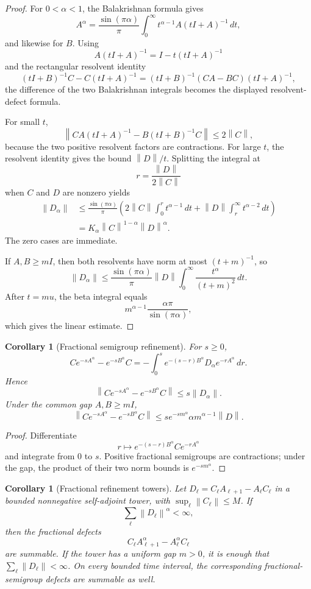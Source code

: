\documentclass[11pt]{article}
\newtheorem{corollary}[theorem]{Corollary}
\theoremstyle{definition}
\theoremstyle{remark}
\newcommand{\norm}[1]{\left\lVert#1\right\rVert}
\begin{document}
\begin{proof}
For $0<\alpha<1$, the Balakrishnan formula gives
\[
A^\alpha
=
\frac{\sin(\pi\alpha)}{\pi}
\int_0^\infty t^{\alpha-1}A(tI+A)^{-1}\,dt,
\]
and likewise for $B$.  Using
\[
A(tI+A)^{-1}=I-t(tI+A)^{-1}
\]
and the rectangular resolvent identity
\[
(tI+B)^{-1}C-C(tI+A)^{-1}
=
(tI+B)^{-1}(CA-BC)(tI+A)^{-1},
\]
the difference of the two Balakrishnan integrals becomes the displayed resolvent-defect formula.

For small $t$,
\[
\norm{CA(tI+A)^{-1}-B(tI+B)^{-1}C}
\le 2\norm C,
\]
because the two positive resolvent factors are contractions.  For large $t$, the resolvent identity gives the bound $\norm D/t$.  Splitting the integral at
\[
r=\frac{\norm D}{2\norm C}
\]
when $C$ and $D$ are nonzero yields
\[
\begin{aligned}
\norm{D_\alpha}
&\le
\frac{\sin(\pi\alpha)}{\pi}
\left(
2\norm C\int_0^r t^{\alpha-1}\,dt
+
\norm D\int_r^\infty t^{\alpha-2}\,dt
\right)\\
&=
K_\alpha\norm C^{1-\alpha}\norm D^\alpha.
\end{aligned}
\]
The zero cases are immediate.

If $A,B\ge mI$, then both resolvents have norm at most $(t+m)^{-1}$, so
\[
\norm{D_\alpha}
\le
\frac{\sin(\pi\alpha)}{\pi}\norm D
\int_0^\infty\frac{t^\alpha}{(t+m)^2}\,dt.
\]
After $t=mu$, the beta integral equals
\[
m^{\alpha-1}\frac{\alpha\pi}{\sin(\pi\alpha)},
\]
which gives the linear estimate.
\end{proof}

\begin{corollary}[Fractional semigroup refinement]\label{cor:fractional-semigroup-refinement}
For $s\ge0$,
\[
\boxed{
Ce^{-sA^\alpha}-e^{-sB^\alpha}C
=
-\int_0^s
 e^{-(s-r)B^\alpha}D_\alpha e^{-rA^\alpha}\,dr.
}
\]
Hence
\[
\norm{Ce^{-sA^\alpha}-e^{-sB^\alpha}C}
\le s\norm{D_\alpha}.
\]
Under the common gap $A,B\ge mI$,
\[
\boxed{
\norm{Ce^{-sA^\alpha}-e^{-sB^\alpha}C}
\le
s e^{-sm^\alpha}\alpha m^{\alpha-1}\norm D.
}
\]
\end{corollary}

\begin{proof}
Differentiate
\[
r\longmapsto e^{-(s-r)B^\alpha}Ce^{-rA^\alpha}
\]
and integrate from $0$ to $s$.  Positive fractional semigroups are contractions; under the gap, the product of their two norm bounds is $e^{-sm^\alpha}$.
\end{proof}

\begin{corollary}[Fractional refinement towers]
Let $D_\ell=C_\ell A_{\ell+1}-A_\ell C_\ell$ in a bounded nonnegative self-adjoint tower, with $\sup_\ell\norm{C_\ell}\le M$.  If
\[
\sum_\ell\norm{D_\ell}^{\alpha}<\infty,
\]
then the fractional defects
\[
C_\ell A_{\ell+1}^{\alpha}-A_\ell^{\alpha}C_\ell
\]
are summable.  If the tower has a uniform gap $m>0$, it is enough that $\sum_\ell\norm{D_\ell}<\infty$.  On every bounded time interval, the corresponding fractional-semigroup defects are summable as well.
\end{corollary}
\end{document}
